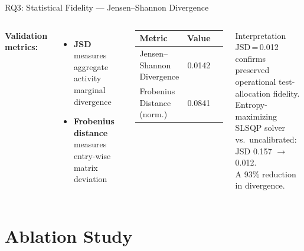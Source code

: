 \documentclass[aspectratio=169,10pt]{beamer}
\newcommand{\pos}[1]{\textcolor{positive}{#1}}
\newcommand{\HL}[1]{\textcolor{emphasis}{#1}}
\begin{document}
\begin{frame}{RQ3: Statistical Fidelity — Jensen–Shannon Divergence}
  \begin{columns}[T]
      \textbf{Validation metrics:}
      \begin{itemize}
        \item \textbf{JSD} measures aggregate activity marginal divergence
        \item \textbf{Frobenius distance} measures entry-wise matrix deviation
      \end{itemize}
      \vspace{0.5em}
      \begin{center}
      \small
      \begin{tabular}{l c c}
        \toprule
        \textbf{Metric} & \textbf{Value} \\
        \midrule
        Jensen–Shannon Divergence & \pos{0.0142} \\
        Frobenius Distance (norm.) & \pos{0.0841} \\
        \bottomrule
      \end{tabular}
      \end{center}
      \begin{exampleblock}{\HL{Interpretation}}
        JSD\,=\,0.012 confirms \pos{preserved operational test-allocation fidelity}.\\[6pt]
        Entropy-maximizing SLSQP solver vs.\ uncalibrated: JSD 0.157 $\to$ 0.012.\\
        A \HL{93\% reduction} in divergence.
      \end{exampleblock}
  \end{columns}
\end{frame}

\section{Ablation Study}
\end{document}
